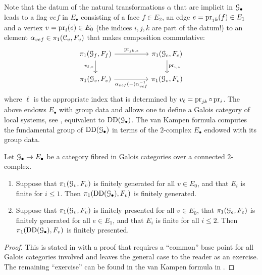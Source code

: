 Note that the datum of the natural transformations $\alpha$ that are implicit in ${\mathcal G}_\bullet$ leads to a flag $vef$ in $E_\bullet$ consisting of a face $f \in E_2$, an edge $e = \operatorname{pr}_{jk}(f) \in E_1$ and a vertex $v = \operatorname{pr}_i(e) \in E_0$ (the indices $i,j,k$ are part of the datum!) to an element $\alpha_{vef} \in \pi_1({\mathcal C}_v,F_v)$ that makes composition commutative:
\[
\begin{tikzcd}
\pi_1(\cG_f,F_f) \ar[rr,"\pr_{jk,\ast}"] \ar[d,"v_{\ell,\ast}",swap] && \pi_1(\cG_e,F_e) \ar[d,"\pr_{i,\ast}"] \\
\pi_1(\cG_v,F_v) \ar[rr,"\alpha_{vef}(-)\alpha_{vef}^{-1}",swap] && \pi_1(\cG_v,F_v)
\end{tikzcd}
\]
where $\ell$ is the appropriate index that is determined by $v_\ell = \operatorname{pr}_{jk} \circ \operatorname{pr}_i$.
The above endows $E_\bullet$ with group data and allows one to define a Galois category of local systems, see \cite[\S4.3]{Stix2006:vanKampen}, equivalent to $\operatorname{DD}({\mathcal G}_\bullet)$. The van Kampen formula 
\cite[Corollary~3.3]{Stix2006:vanKampen} computes the fundamental group of  $\operatorname{DD}({\mathcal G}_\bullet)$ in terms of the $2$-complex $E_\bullet$ endowed with its group data. 

\begin{prop}
\label{prop:DD-fgfp}
    Let ${\mathcal G}_\bullet \to E_\bullet$ be a category fibred in Galois categories over a connected $2$-complex. 
    \begin{enumerate}[ref=(\arabic*)]
        \item
        \label{propitem:DD-fg}
        Suppose that $\pi_1({\mathcal G}_v,F_v)$ is  finitely generated for all $v \in E_0$, and that $E_i$ is finite for $i \leq 1$. 
        Then $\pi_1(\operatorname{DD}({\mathcal G}_\bullet),F_v)$ is finitely generated.
        \item
        \label{propitem:DD-fp}
        Suppose that $\pi_1({\mathcal G}_v,F_v)$ is finitely presented for all $v \in E_0$, that $\pi_1({\mathcal G}_e,F_e)$ is  finitely generated for all $e \in E_1$, and that $E_i$ is finite for all $i \leq 2$.
        Then $\pi_1(\operatorname{DD}({\mathcal G}_\bullet),F_v)$ is finitely presented.
    \end{enumerate}
\end{prop}
\begin{proof}
This is stated in \cite[IX Corollaire~5.2,~5.3]{SGA1} with a proof that requires a ``common'' base point for all Galois categories involved and leaves the general case to the reader as an exercise. The remaining ``exercise'' can be found in the van Kampen formula in \cite[Corollary~3.3]{Stix2006:vanKampen}.  
\end{proof}

